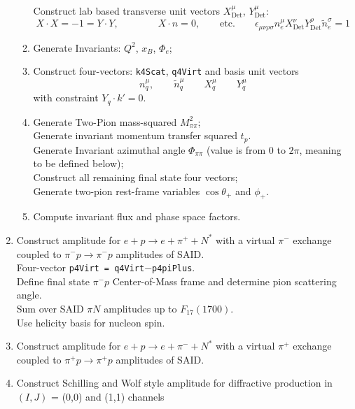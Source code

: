 \documentclass[12pt,amsmath,letter,notitlepage]{revtex4-1}
\begin{document}
\begin{enumerate}
\begin{enumerate}
Construct lab based transverse unit vectors $X_\text{Det}^\mu$, $Y_\text{Det}^\mu$:\\
\begin{equation}
X\cdot X = -1 = Y\cdot Y, \qquad\qquad X\cdot n = 0, \qquad \text{etc.} \qquad
\epsilon_{\mu\nu\rho\sigma}n_e^\mu X_\text{Det}^\nu Y_\text{Det}^\rho  \widetilde n_e^\sigma = 1
\end{equation}
\item Generate Invariants: $Q^2$, $x_B$, $\Phi_e$;
\item Construct four-vectors: {\tt k4Scat}, {\tt q4Virt} and basis unit vectors
$$ n_q^\mu, \qquad \widetilde n_q^\mu \qquad X_q^\mu \qquad Y_q^\mu$$
with constraint $Y_q\cdot k' = 0$.
\item Generate Two-Pion mass-squared $M_{\pi\pi}^2$;\\
Generate invariant momentum transfer squared $t_p$.\\
Generate Invariant azimuthal angle $\Phi_{\pi\pi}$ (value is from 0 to $2\pi$, meaning to be defined below);\\
Construct all remaining final state four vectors;\\
Generate two-pion rest-frame variables $\cos\theta_+$ and $\phi_+$.
\item Compute invariant flux and phase space factors.
\end{enumerate}
\item
Construct amplitude for $e+p \to e + \pi^+ + N^\ast$
with a virtual $\pi^-$ exchange coupled to $\pi^- p \to \pi^- p$ amplitudes of SAID. \\
Four-vector {\tt p4Virt = q4Virt$-$p4piPlus}.\\
Define final state $\pi^- p$ Center-of-Mass frame and determine pion scattering angle.\\
Sum over SAID $\pi N$ amplitudes up to $F_{17}(1700)$.\\
Use helicity basis for nucleon spin.
\item
Construct amplitude for 
$
e+p \to e + \pi^- + N^*
$
with a virtual $\pi^+$ exchange coupled to $\pi^+ p \to \pi^+ p$ amplitudes of SAID.
\item
Construct Schilling and Wolf style amplitude for diffractive production in $(I,J)$ = (0,0) and (1,1)
channels
\end{enumerate}
\end{document}
